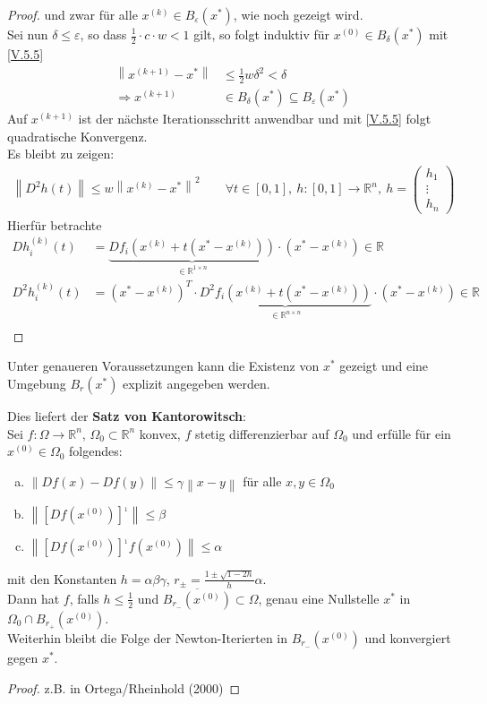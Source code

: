 \documentclass[ngerman,fontsize=11pt, paper=a4, parskip=half, titlepage=true, toc=bib]{scrbook}
\newcommand{\R}{\mathds{R}}
\newcommand{\Ren}{\mathds{R}^{n}}
\newcommand{\nn}[1]{\left\| #1 \right\|}
\begin{document}
\begin{proof}
    und zwar für alle $x^{(k)}\in B_\varepsilon(x^{*})$, wie noch gezeigt wird.\\
    Sei nun $\delta \leq \varepsilon$, so dass $\frac{1}{2} \cdot c\cdot w <1$ gilt,
    so folgt induktiv für $x^{(0)}\in B_\delta(x^{*})$ mit \eqref{V.5.5}
    \begin{align*}
      \nn{x^{(k+1)}-x^{*}} &\leq \frac{1}{2}w\delta^2 < \delta\\
      \Rightarrow x^{(k+1)}&\in B_\delta(x^{*})\subseteq B_\varepsilon(x^{*})
    \end{align*}
    Auf $x^{(k+1)} $ ist der nächste Iterationsschritt anwendbar
    und mit \eqref{V.5.5} folgt quadratische Konvergenz.\\
    Es bleibt zu zeigen:
    \begin{gather*}
      \nn{D^2h(t)} \leq w\nn{x^{(k)}-x^{*}}^2 \qquad \forall t\in [0,1],~
      h:[0,1]\rightarrow\Ren,~ h=\begin{pmatrix} h_1 \\ \vdots \\ h_n \end{pmatrix}
    \end{gather*}
    Hierfür betrachte
    \begin{align*}
      Dh_i^{(k)}(t)&=\underbrace{Df_i\left( x^{(k)}+t(x^{*}-x^{(k)})\right)}_{\in \R^{1\times n}}
                     \cdot (x^{*}-x^{(k)})\in\R\\
      D^2h_i^{(k)}(t)&=(x^{*}-x^{(k)})^T\cdot
                       \underbrace{D^2f_i\left( x^{(k)}+t(x^{*}-x^{(k)})\right)}_{\in \R^{n\times n}}
                       \cdot (x^{*}-x^{(k)})\in\R\\
    \end{align*}
  \end{proof}
  
  Unter genaueren Voraussetzungen kann die Existenz von $x^{*}$ gezeigt 
  und eine Umgebung $B_r(x^{*})$ explizit angegeben werden.
  
  Dies liefert der \textbf{Satz von Kantorowitsch}:\\
  Sei $f:\Omega\rightarrow \Ren$, $\Omega_0 \subset \Ren$ konvex,
  $f$ stetig differenzierbar auf $\Omega_0$ und 
  erfülle für ein $x^{(0)}\in \Omega_0$ folgendes:
  \begin{enumerate}[a)]
  \item $\nn{Df(x) -Df(y)}\leq \gamma \nn{x-y}$ für alle $x,y\in \Omega_0$
  \item $\nn{[Df(x^{(0)})]^{_1}} \leq \beta$
  \item $\nn{[Df(x^{(0)})]^{_1}f(x^{(0)})} \leq \alpha$
  \end{enumerate}
  mit den Konstanten $h=\alpha\beta\gamma$, $r_\pm = \frac{1\pm \sqrt{1-2h}}{h}\alpha$.\\
  Dann hat $f$, falls $h\leq \frac{1}{2}$ und $\overline{B_{r_{-}}(x^{(0)})}\subset \Omega$,
  genau eine Nullstelle $x^{*}$ in $\Omega_0\cap B_{r_+}(x^{(0)})$.\\
  Weiterhin bleibt die Folge der Newton-Iterierten in $B_{r_{-}}(x^{(0)})$
  und konvergiert gegen $x^{*}$.
  \begin{proof}
    z.B. in Ortega/Rheinhold (2000)
  \end{proof}
  
\end{document}
